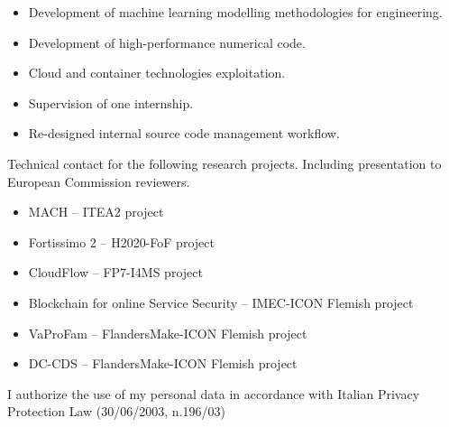 \documentclass[10pt,a4paper]{altacv}
\begin{document}

\begin{itemize}
\item Development of machine learning modelling methodologies for engineering.
\item Development of high-performance numerical code.
\item Cloud and container technologies exploitation.
\item Supervision of one internship.
\item Re-designed internal source code management workflow.
\end{itemize}


Technical contact for the following research projects. Including presentation to European Commission reviewers.
\smallskip
\begin{itemize}
  \item MACH -- ITEA2 project
\item Fortissimo 2 -- H2020-FoF project
\item CloudFlow -- FP7-I4MS project
\item Blockchain for online Service Security -- IMEC-ICON Flemish project
\item VaProFam -- FlandersMake-ICON Flemish project
\item DC-CDS -- FlandersMake-ICON Flemish project
\end{itemize}

\divider 

{\color{gray} \small I authorize the use of my personal data in accordance with Italian Privacy Protection Law (30/06/2003, n.196/03)}
\end{document}

